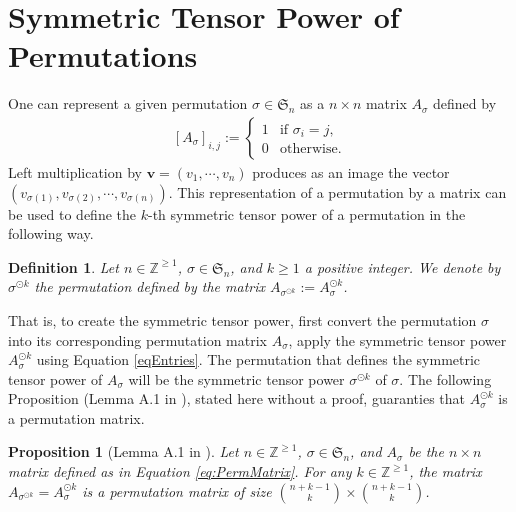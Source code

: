 \documentclass[12pt]{amsart}
\newtheorem{proposition}{Proposition}[section]
\newtheorem{definition}{Definition}[section]
\begin{document}
\section{Symmetric Tensor Power of Permutations} 

One can represent a given permutation $\sigma \in \mathfrak{S}_n$ as a $n \times n$ matrix $A_{\sigma}$ defined by 
\begin{align}
\label{eq:PermMatrix}
\left [A_{\sigma}\right ]_{i,j} := \begin{cases}
    1 & \text{if } \sigma _i = j,\\
    0 & \text{otherwise.} 
\end{cases}    
\end{align}
Left multiplication by $\textbf{v} = (v_1,\cdots ,v_n)$ produces as an image the vector $(v_{\sigma (1)},v_{\sigma (2)},\cdots , v_{\sigma (n)})$. This representation of a permutation by a matrix can be used to define the $k$-th symmetric tensor power of a permutation in the following way.
\begin{definition}
    Let $n\in \mathbb{Z}^{\geq 1}$, $\sigma \in \mathfrak{S}_n$, and $k\geq 1$ a positive integer. We denote by $\sigma ^{\odot k}$ the permutation defined by the matrix $A_{\sigma ^{\odot k}} := A_{\sigma}^{\odot k}$.
\end{definition}
That is, to create the symmetric tensor power, first convert the permutation $\sigma$ into its corresponding permutation matrix $A_{\sigma}$, apply the symmetric tensor power $A_{\sigma}^{\odot k}$ using Equation \ref{eqEntries}. The permutation that defines the symmetric tensor power of $A_{\sigma}$ will be the symmetric tensor power $\sigma ^{\odot k}$ of $\sigma$. The following Proposition (Lemma A.1 in \cite{AstaizaetAl2026}), stated here without a proof, guaranties that $A_{\sigma}^{\odot k}$ is a permutation matrix.
\begin{proposition}[Lemma A.1 in \cite{AstaizaetAl2026}]
\label{prop:diag}
    Let $n\in \mathbb{Z}^{\geq 1}$, $\sigma \in \mathfrak{S}_n$, and $A_{\sigma}$ be the $n\times n$ matrix defined as in Equation \ref{eq:PermMatrix}. For any $k\in \mathbb{Z}^{\geq 1}$, the matrix $A_{\sigma ^{\odot k}}=A_{\sigma}^{\odot k}$ is a permutation matrix of size $\binom{n+k-1}{k} \times \binom{n+k-1}{k}$.
\end{proposition}
\end{document}
